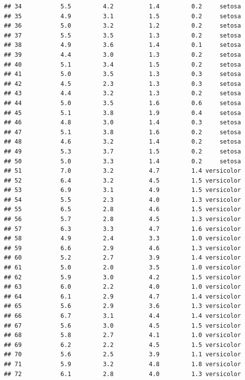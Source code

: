 \documentclass[
]{book}
\begin{document}
\begin{verbatim}
## 34           5.5         4.2          1.4         0.2     setosa
## 35           4.9         3.1          1.5         0.2     setosa
## 36           5.0         3.2          1.2         0.2     setosa
## 37           5.5         3.5          1.3         0.2     setosa
## 38           4.9         3.6          1.4         0.1     setosa
## 39           4.4         3.0          1.3         0.2     setosa
## 40           5.1         3.4          1.5         0.2     setosa
## 41           5.0         3.5          1.3         0.3     setosa
## 42           4.5         2.3          1.3         0.3     setosa
## 43           4.4         3.2          1.3         0.2     setosa
## 44           5.0         3.5          1.6         0.6     setosa
## 45           5.1         3.8          1.9         0.4     setosa
## 46           4.8         3.0          1.4         0.3     setosa
## 47           5.1         3.8          1.6         0.2     setosa
## 48           4.6         3.2          1.4         0.2     setosa
## 49           5.3         3.7          1.5         0.2     setosa
## 50           5.0         3.3          1.4         0.2     setosa
## 51           7.0         3.2          4.7         1.4 versicolor
## 52           6.4         3.2          4.5         1.5 versicolor
## 53           6.9         3.1          4.9         1.5 versicolor
## 54           5.5         2.3          4.0         1.3 versicolor
## 55           6.5         2.8          4.6         1.5 versicolor
## 56           5.7         2.8          4.5         1.3 versicolor
## 57           6.3         3.3          4.7         1.6 versicolor
## 58           4.9         2.4          3.3         1.0 versicolor
## 59           6.6         2.9          4.6         1.3 versicolor
## 60           5.2         2.7          3.9         1.4 versicolor
## 61           5.0         2.0          3.5         1.0 versicolor
## 62           5.9         3.0          4.2         1.5 versicolor
## 63           6.0         2.2          4.0         1.0 versicolor
## 64           6.1         2.9          4.7         1.4 versicolor
## 65           5.6         2.9          3.6         1.3 versicolor
## 66           6.7         3.1          4.4         1.4 versicolor
## 67           5.6         3.0          4.5         1.5 versicolor
## 68           5.8         2.7          4.1         1.0 versicolor
## 69           6.2         2.2          4.5         1.5 versicolor
## 70           5.6         2.5          3.9         1.1 versicolor
## 71           5.9         3.2          4.8         1.8 versicolor
## 72           6.1         2.8          4.0         1.3 versicolor

\end{verbatim}
\end{document}
